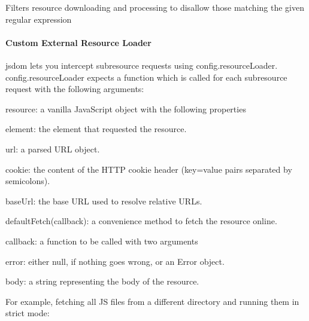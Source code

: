 Filters resource downloading and processing to disallow those matching the given regular expression

\paragraph*{Custom External Resource Loader}

jsdom lets you intercept subresource requests using {\ttfamily config.\+resource\+Loader}. {\ttfamily config.\+resource\+Loader} expects a function which is called for each subresource request with the following arguments\+:


\begin{DoxyItemize}
\item {\ttfamily resource}\+: a vanilla Java\+Script object with the following properties
\begin{DoxyItemize}
\item {\ttfamily element}\+: the element that requested the resource.
\item {\ttfamily url}\+: a parsed U\+RL object.
\item {\ttfamily cookie}\+: the content of the H\+T\+TP cookie header ({\ttfamily key=value} pairs separated by semicolons).
\item {\ttfamily base\+Url}\+: the base U\+RL used to resolve relative U\+R\+Ls.
\item {\ttfamily default\+Fetch(callback)}\+: a convenience method to fetch the resource online.
\end{DoxyItemize}
\item {\ttfamily callback}\+: a function to be called with two arguments
\begin{DoxyItemize}
\item {\ttfamily error}\+: either {\ttfamily null}, if nothing goes wrong, or an {\ttfamily Error} object.
\item {\ttfamily body}\+: a string representing the body of the resource.
\end{DoxyItemize}
\end{DoxyItemize}

For example, fetching all JS files from a different directory and running them in strict mode\+:




